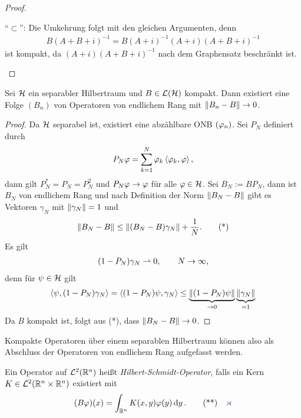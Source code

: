\begin{proof}
\begin{proofenum}
``$\subset$'': Die Umkehrung folgt mit den gleichen Argumenten, denn
\begin{align*}
B(A+B+i)^{-1} = B(A+i)^{-1}(A+i)(A+B+i)^{-1}
\end{align*}
ist kompakt, da $(A+i)(A+B+i)^{-1}$ nach dem Graphensatz beschränkt ist.\qedhere
\end{proofenum}
\end{proof}

\begin{thm}
\label{prop:7.4}
Sei $\mathcal{H}$ ein separabler Hilbertraum und $B\in\mathcal{L}(\mathcal{H})$ kompakt. Dann existiert
eine Folge $(B_n)$ von Operatoren von endlichem Rang mit $\left\|B_n-B\right\|\to
0$.\fishhere
\end{thm}
\begin{proof}
Da $\mathcal{H}$ separabel ist, existiert eine abzählbare ONB $(\varphi_n)$. Sei $P_N$
definiert durch
\begin{align*}
P_N\varphi = \sum_{k=1}^N \varphi_k \left\langle\varphi_k,\varphi\right\rangle,
\end{align*}
dann gilt $P_N^* = P_N = P_N^2$ und $P_N\varphi \to \varphi$ für alle $\varphi\in\mathcal{H}$. Sei
$B_N := BP_N$, dann ist $B_N$ von endlichem Rang und nach Definition der Norm
 $\left\|B_N-B\right\|$ gibt es Vektoren $\gamma_N$ mit $\left\|\gamma_N\right\|=1$ und
\begin{align*}
\left\|B_N-B\right\| \le \left\|(B_N-B)\gamma_N\right\| + \frac{1}{N}.\tag{*}
\end{align*}
Es gilt
\begin{align*}
(1-P_N)\gamma_N \rightharpoonup 0,\qquad N\to \infty, 
\end{align*}
denn für $\psi\in\mathcal{H}$ gilt
\begin{align*}
\left\langle\psi,(1-P_N)\gamma_N\right\rangle = \left\langle(1-P_N)\psi,\gamma_N\right\rangle
\le \underbrace{\left\|(1-P_N)\psi\right\|}_{\to 0}\underbrace{\left\|\gamma_N\right\|}_{=1}
\end{align*}
Da $B$ kompakt ist, folgt aus (*), dass $\left\|B_N-B\right\|\to 0$.\qedhere
\end{proof}

Kompakte Operatoren über einem separablen Hilbertraum können also als Abschluss
der Operatoren von endlichem Rang aufgefasst werden.

\begin{defn*}
Ein Operator auf $\mathcal{L}^2(\mathbb{R}^n)$ heißt
\emph{Hilbert-Schmidt-Operator}, falls ein Kern
$K\in\mathcal{L}^2(\mathbb{R}^n\times\mathbb{R}^n)$ existiert mit
\begin{align*}
(B\ph)(x) = \int_{\R^n} K(x,y)\ph(y)\dy.\tag{**}\fishhere
\end{align*}
\end{defn*}

